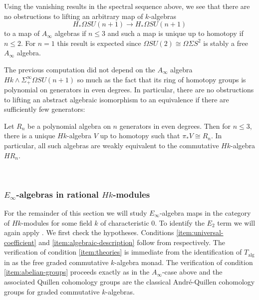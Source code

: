 \documentclass[leqno,oneside,english]{elsarticle}
\begin{document}
\begin{example}
   Using the vanishing results in the spectral sequence above, we see that there are no obstructions to lifting an arbitrary map of $k$-algebras 
   \[ 
   H_*\Omega SU(n+1)\rightarrow H_* \Omega SU(n+1) 
   \]
   to a map of $A_{\infty}$ algebras if $n\leq 3$ and such a map is
   unique up to homotopy if $n\leq 2$.  For $n = 1$ this result is
   expected since $\Omega SU(2)\cong \Omega \Sigma S^2$ is stably a free
   $A_{\infty}$ algebra. 
   {{\ifshowsaveblocks
{}
\fi}}{}\end{example}

The previous computation did not depend on the $A_\infty$ algebra $Hk
\wedge \Sigma^{\infty}_{+}\Omega SU(n+1)$ so much as the fact that its ring of
homotopy groups is polynomial on generators in even degrees. In
particular, there are no obstructions to lifting an abstract algebraic
isomorphism to an equivalence if there are sufficiently few generators:

\begin{prop}
  Let $R_n$ be a polynomial algebra on $n$ generators in even degrees.
  Then for $n\leq 3$, there is a unique $Hk$-algebra $V$ up to
  homotopy such that $\pi_* V\cong R_n$. In particular, all such algebras
  are weakly equivalent to the commutative $Hk$-algebra $HR_n$.
  {{\ifshowsaveblocks
{}
\fi}}{}\end{prop}

\ 
\subsubsection*{$E_\infty$-algebras in rational $Hk$-modules}

For the remainder of this section we will study $E_{\infty}$-algebra maps in the category of $Hk$-modules for some field $k$ of characteristic 0.  To identify the $E_2$ term we will again apply . We first check the hypotheses. Conditions \eqref{item:universal-coefficient} and \eqref{item:algebraic-description} follow from  respectively. The verification of condition \eqref{item:theories} is immediate from the identification of $T_{\mathrm{alg}}$ in  as the free graded commutative $k$-algebra monad. The verification of condition \eqref{item:abelian-groups} proceeds exactly as in the $A_{\infty}$-case above and the associated Quillen cohomology groups are the classical Andr\'e-Quillen cohomology groups for graded commutative $k$-algebras.
\end{document}
